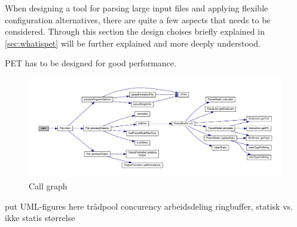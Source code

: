 When designing a tool for parsing large input files and applying flexible configuration alternatives,
there are quite a few aspects that needs to be considered. Through this section the design choises
briefly explained in \autoref{sec:whatispet} will be further explained and more deeply understood.

PET has to be designed for good performance.


\begin{figure}
%    
    \includegraphics[width=\textwidth]{figs/maincallgraph.pdf}
    \caption{Call graph}
    \label{fig:callgraph}
\end{figure}

put UML-figures here
trådpool
concurency
arbeidsdeling
ringbuffer, statisk vs. ikke statis størrelse





